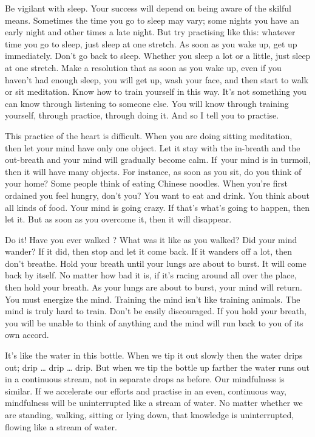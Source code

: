 Be vigilant with sleep. Your success will depend on being aware of the skilful means. Sometimes the time you go to sleep may vary; some nights you have an early night and other times a late night. But try practising like this: whatever time you go to sleep, just sleep at one stretch. As soon as you wake up, get up immediately. Don't go back to sleep. Whether you sleep a lot or a little, just sleep at one stretch. Make a resolution that as soon as you wake up, even if you haven't had enough sleep, you will get up, wash your face, and then start to walk  or sit meditation. Know how to train yourself in this way. It's not something you can know through listening to someone else. You will know through training yourself, through practice, through doing it. And so I tell you to practise.

This practice of the heart is difficult. When you are doing sitting meditation, then let your mind have only one object. Let it stay with the in-breath and the out-breath and your mind will gradually become calm. If~your mind is in turmoil, then it will have many objects. For instance, as soon as you sit, do you think of your home? Some people think of eating Chinese noodles. When you're first ordained you feel hungry, don't you? You want to eat and drink. You think about all kinds of food. Your mind is going crazy. If that's what's going to happen, then let it. But as soon as you overcome it, then it will disappear.

Do it! Have you ever walked ? What was it like as you walked? Did your mind wander? If it did, then stop and let it come back. If it wanders off a lot, then don't breathe. Hold your breath until your lungs are about to burst. It will come back by itself. No matter how bad it is, if it's racing around all over the place, then hold your breath. As your lungs are about to burst, your mind will return. You must energize the mind. Training the mind isn't like training animals. The mind is truly hard to train. Don't be easily discouraged. If you hold your breath, you will be unable to think of anything and the mind will run back to you of its own accord.

It's like the water in this bottle. When we tip it out slowly then the water drips out; drip \ldots{} drip \ldots{} drip. But when we tip the bottle up farther the water runs out in a continuous stream, not in separate drops as before. Our mindfulness is similar. If we accelerate our efforts and practise in an even, continuous way, mindfulness will be uninterrupted like a stream of water. No matter whether we are standing, walking, sitting or lying down, that knowledge is uninterrupted, flowing like a stream of water.


